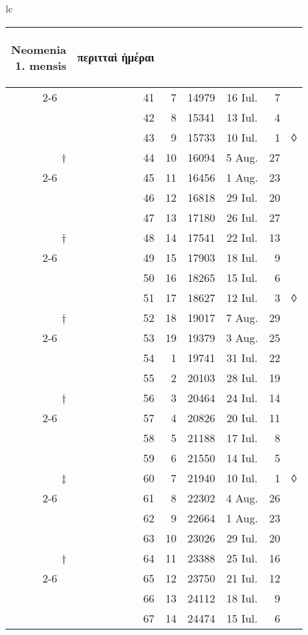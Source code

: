 \begin{tabular}{lc}
\begin{tabular}[t]{r rrccr l}
\begin{rotate}{60}\hspace{5pt}\parbox[t]{3cm}{Neomenia\\1. mensis}\end{rotate} &
\begin{rotate}{60}\textgreek{περιτταὶ ἡμέραι}\end{rotate} &
~
\\
\cline{2-6}
~ & 41 &  7 & 14979 & 16 Iul. &  7 \\
~ & 42 &  8 & 15341 & 13 Iul. &  4 \\
~ & 43 &  9 & 15733 & 10 Iul. &  1 & ◊ \\
† & 44 & 10 & 16094 &  5 Aug. & 27 \\
\cline{2-6}
~ & 45 & 11 & 16456 &  1 Aug. & 23 \\
~ & 46 & 12 & 16818 & 29 Iul. & 20 \\
~ & 47 & 13 & 17180 & 26 Iul. & 27 \\
† & 48 & 14 & 17541 & 22 Iul. & 13 \\
\cline{2-6}
~ & 49 & 15 & 17903 & 18 Iul. &  9 \\
~ & 50 & 16 & 18265 & 15 Iul. &  6 \\
~ & 51 & 17 & 18627 & 12 Iul. &  3 & ◊ \\
† & 52 & 18 & 19017 &  7 Aug. & 29 \\
\cline{2-6}
~ & 53 & 19 & 19379 &  3 Aug. & 25 \\
~ & 54 &  1 & 19741 & 31 Iul. & 22 \\
~ & 55 &  2 & 20103 & 28 Iul. & 19 \\
† & 56 &  3 & 20464 & 24 Iul. & 14 \\
\cline{2-6}
~ & 57 &  4 & 20826 & 20 Iul. & 11 \\
~ & 58 &  5 & 21188 & 17 Iul. &  8 \\
~ & 59 &  6 & 21550 & 14 Iul. &  5 \\
‡ & 60 &  7 & 21940 & 10 Iul. &  1 & ◊ \\
\cline{2-6}
~ & 61 &  8 & 22302 &  4 Aug. & 26 \\
~ & 62 &  9 & 22664 &  1 Aug. & 23 \\
~ & 63 & 10 & 23026 & 29 Iul. & 20 \\
† & 64 & 11 & 23388 & 25 Iul. & 16 \\
\cline{2-6}
~ & 65 & 12 & 23750 & 21 Iul. & 12 \\
~ & 66 & 13 & 24112 & 18 Iul. &  9 \\
~ & 67 & 14 & 24474 & 15 Iul. &  6 \\

\end{tabular}
\end{tabular}

